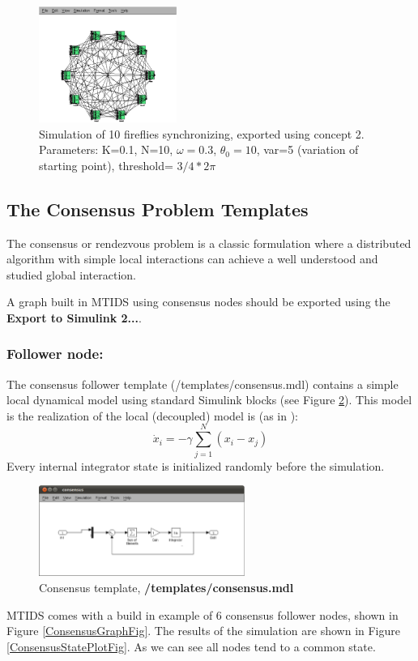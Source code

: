 \documentclass[a4paper,twoside, openright,12pt]{report}
\begin{document}
\begin{figure}[htb]
\centering
\includegraphics[width=0.4\textwidth]{pics/screenfireflies.eps}
\caption[MTIDS fireflies synchronization]{Simulation of 10 fireflies synchronizing, exported using concept 2. Parameters: K=0.1, N=10, $\omega=0.3$, $\theta_0=10$, var=5 (variation of starting point), threshold= $3/4*2\pi$}
\label{syncFig}
\end{figure}

\subsection{The Consensus Problem Templates}

The consensus or rendezvous problem is a classic formulation where a distributed algorithm with simple
local interactions can achieve a well understood and studied global interaction.

A graph built in MTIDS using consensus nodes should be exported using the \textbf{Export to Simulink 2...}. 


\subsubsection{Follower node:}
The consensus follower template (/templates/consensus.mdl) contains a simple local dynamical model using standard Simulink blocks (see Figure \ref{templateConsensusFig}).
 This model is the realization of the local (decoupled) model is (as in \cite{NCS}):
\begin{equation}
\dot{x}_i = - \gamma \sum_{j=1}^{N}(x_i - x_j)
\end{equation}
Every internal integrator state is initialized randomly before the simulation.
\begin{figure}[htb]
\centering
\includegraphics[width=0.6\textwidth]{pics/consensus_template.eps}
\caption[MTIDS Consensus Template]{Consensus template, \textbf{/templates/consensus.mdl}}
\label{templateConsensusFig}
\end{figure}
MTIDS comes with a build in example of 6 consensus follower nodes, shown in Figure \ref{ConsensusGraphFig}.
The results of the simulation are shown in Figure \ref{ConsensusStatePlotFig}. As we can see all nodes tend to a common state.
\end{document}
